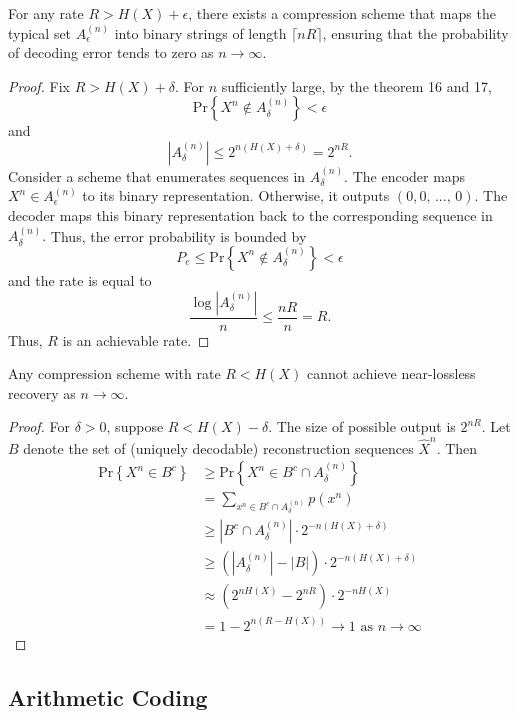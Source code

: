 \begin{theorem}[Achievability]
For any rate $R>H(X)+\epsilon$, there exists a compression scheme that maps the typical set $A_{\epsilon}^{(n)}$ into binary strings of length $\lceil nR\rceil$, ensuring that the probability of decoding error tends to zero as $n\to\infty$.
\end{theorem}
\begin{proof}
Fix $R > H(X) + \delta$. For $n$ sufficiently large, by the theorem 16 and 17, 
$$
\text{Pr}\left\{X^n \notin A_\delta^{(n)}\right\} < \epsilon
$$
and
$$
\left|A_\delta^{(n)}\right| \leq2^{n(H(X)+\delta)}=2^{nR}.
$$
Consider a scheme that enumerates sequences in $A_{\delta}^{(n)}$. The encoder maps $X^n \in A_\epsilon^{(n)}$ to its binary representation. Otherwise, it outputs $(0,0,\,...,\,0)$. The decoder maps this binary representation back to the corresponding sequence in $A_\delta^{(n)}.$ Thus, the error probability is bounded by
$$
P_e \leq \text{Pr}\left\{X^n \notin A_\delta^{(n)}\right\} < \epsilon
$$
and the rate is equal to
$$
\frac{\log \left|A_\delta^{(n)}\right|}{n} \leq \frac{nR}{n}=R.
$$
Thus, $R$ is an achievable rate.
\end{proof}

\begin{theorem}[Converse]
Any compression scheme with rate $R<H(X)$ cannot achieve near-lossless recovery as $n\to\infty$.
\end{theorem}
\begin{proof}
For $\delta > 0$, suppose $R < H(X)-\delta$. The size of possible output is $2^{nR}.$ Let $B$ denote the set of (uniquely decodable) reconstruction sequences $\hat{X}^n$. Then 
$$
\begin{aligned}
    \text{Pr}\left\{X^n \in B^c\right\} &\geq \text{Pr}\left\{X^n \in B^c \cap A_\delta^{(n)}\right\}\\
    &=\sum_{x^n\in B^c \cap A_\delta^{(n)}}p(x^n)\\
    &\geq \left|B^c \cap A_\delta^{(n)}\right|\cdot2^{-n(H(X)+\delta)}\\
    &\geq \left(|A_\delta^{(n)}|-\left|B\right|\right)\cdot2^{-n(H(X)+\delta)}\\
    & \approx (2^{nH(X)}-2^{nR})\cdot2^{-nH(X)}\\ &=1-2^{n(R-H(X))} \rightarrow 1 \text{ as } n\rightarrow \infty
\end{aligned}
$$
\end{proof}


\subsection{Arithmetic Coding}

